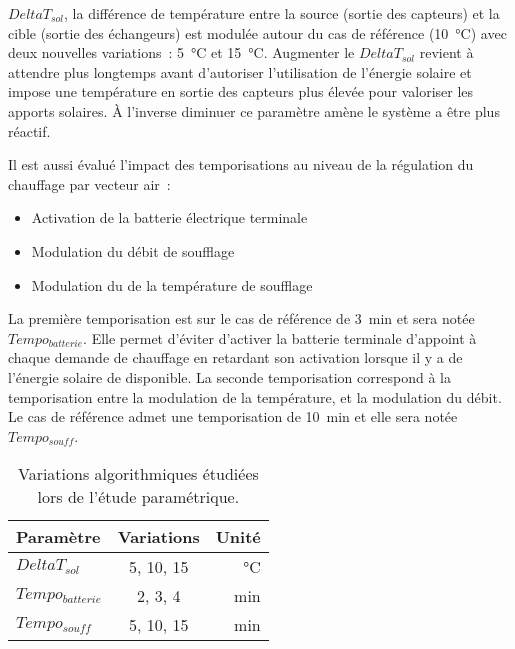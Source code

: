 $DeltaT_{sol}$, la différence de température entre la source (sortie des capteurs) et la cible (sortie des
échangeurs) est modulée autour du cas de référence (\SI{10}{\celsius}) avec deux nouvelles
variations~: \SI{5}{\celsius} et \SI{15}{\celsius}. Augmenter le $DeltaT_{sol}$ revient à
attendre plus longtemps avant d’autoriser l’utilisation de l’énergie solaire et impose une
température en sortie des capteurs plus élevée pour valoriser les apports solaires. À
l’inverse diminuer ce paramètre amène le système a être plus réactif.

Il est aussi évalué l’impact des temporisations au niveau de la régulation du chauffage
par vecteur air~:
\begin{itemize}
  \item Activation de la batterie électrique terminale
  \item Modulation du débit de soufflage
  \item Modulation du de la température de soufflage
\end{itemize}

La première temporisation est sur le cas de référence de \SI{3}{min} et sera notée
$Tempo_{batterie}$. Elle permet d’éviter d’activer la batterie terminale d’appoint à
chaque demande de chauffage en retardant son activation lorsque il y a de l’énergie
solaire de disponible. La seconde temporisation correspond à la temporisation entre la
modulation de la température, et la modulation du débit. Le cas de référence admet une
temporisation de \SI{10}{min} et elle sera notée $Tempo_{souff}$.

\begin{table}
\centering
\begin{tabular}{l c r}
    \toprule
    Paramètre          & Variations                    & Unité         \\
    \midrule
    $DeltaT_{sol}$     & \num{5}, \num{10}, \num{15}   & \si{\celsius} \\
    $Tempo_{batterie}$ & \num{2}, \num{3}, \num{4}     & \si{min}      \\
    $Tempo_{souff}$    & \num{5}, \num{10}, \num{15}   & \si{min}      \\
    \bottomrule
\end{tabular}
\caption{Variations algorithmiques étudiées lors de l’étude paramétrique.
         \label{tab:variations_algo}}
\end{table}



